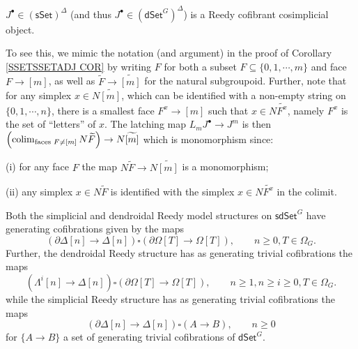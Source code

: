 \documentclass[a4paper,10pt
 ,draft
]{article}%
\begin{document}
\begin{remark}\label{JREEDYCOF REM}
$J^{\bullet} \in \left(\mathsf{sSet}\right)^{\Delta}$ 
(and thus $J^{\bullet} \in \left(\mathsf{dSet}^G\right)^{\Delta}$) is a Reedy cofibrant cosimplicial object. 

To see this, we mimic the notation (and argument) in the proof of
Corollary \ref{SSETSSETADJ COR} by writing 
$F$ for both a subset $F \subseteq \{0,1,\cdots,m\}$
and face $F \to [m]$, as well as $\widetilde{F} \to \widetilde{[m]}$ for the natural subgroupoid.
Further, note that for any simplex $x \in N\widetilde{[m]}$, which can be identified with a non-empty string on $\{0,1,\cdots,n\}$, there is a smallest face $F^x \to [m]$ such that 
$x \in N\widetilde{F^x}$, namely $F^x$ is the set of ``letters'' of $x$.
The latching map $L_m J^{\bullet} \to J^m$ is then
$
\left(\mathop{\operatorname{colim}}_{\text{faces }F \neq [m]} N \widetilde{F}\right) \to N\widetilde{[m]}
$
which is monomorphism since:
\begin{inparaenum}
	\item[(i)] for any face $F$ the map $N \widetilde{F} \to N\widetilde{[m]}$ is a monomorphism;
	\item[(ii)] any simplex $x \in N \widetilde{F}$ is identified with the simplex $x \in N \widetilde{F^x}$ in the colimit.
\end{inparaenum}
\end{remark}


\begin{proposition}
	Both the simplicial and dendroidal Reedy model structures on 
	$\mathsf{sdSet}^G$ have generating cofibrations given by the maps
\begin{equation}\label{JOINTCOF EQ}
	\left(\partial \Delta [n] \to \Delta[n]\right)
		\square
	\left(\partial \Omega[T] \to \Omega[T]\right),
	\qquad
	n\geq 0, T \in \Omega_G.
\end{equation}
  Further, the dendroidal Reedy structure has as generating trivial cofibrations the maps
\begin{equation}\label{DENDTRIVCOF EQ}
	\left(\Lambda^i [n] \to \Delta[n]\right)
		\square
	\left(\partial \Omega[T] \to \Omega[T]\right),
	\qquad
 	n\geq 1, n\geq i \geq 0, T \in \Omega_G.
\end{equation}
while the simplicial Reedy structure has as generating trivial cofibrations the maps
\begin{equation}\label{SIMPTRIVCOF EQ}
	\left(\partial \Delta [n] \to \Delta[n]\right)
		\square
	\left(A \to B\right),
	\qquad
	n\geq 0
\end{equation}
for $\{A \to B\}$ a set of generating trivial cofibrations of
$\mathsf{dSet}^G$.
\end{proposition}
\end{document}
